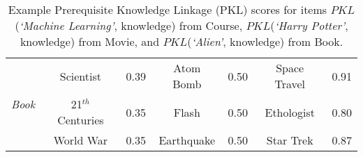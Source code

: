 \begin{table}
{\begin{tabular}{c|cl|cl|cl}
    \multicolumn{1}{l|}{\multirow{3}{*}{\textit{Book }}} & Scientist & 0.39  & Atom Bomb & 0.50  & Space Travel   & 0.91           \\
    & 21$^{th}$ Centuries & 0.35   &  Flash & 0.50      & Ethologist    & 0.80       \\
    & World War & 0.35   &    Earthquake  & 0.50      &  Star Trek     &   0.87      \\ \hline
    
    \end{tabular}
    \caption{Example  Prerequisite Knowledge Linkage (PKL) scores for items $PKL$(\textit{`Machine Learning'}, knowledge) from Course, $PKL$(\textit{`Harry Potter'}, knowledge) from Movie, and $PKL$(\textit{`Alien'}, knowledge) from Book.}
    \label{tab:pre-sample}
}

\end{table}





